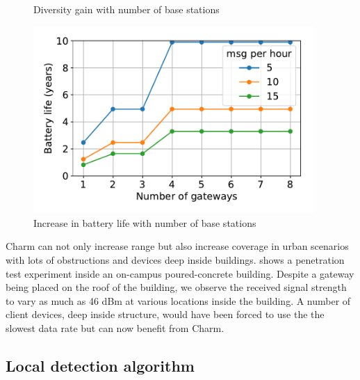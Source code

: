 \begin{figure}
\begin{minipage}{.32\textwidth}
\hspace*{-0.1in}
\caption{Diversity gain with number of base stations}
\label{fig:diversity-gain}
\compactimg
\end{minipage}
\hfill
\begin{minipage}{.32\textwidth}
\centering
\includegraphics[width=0.95\textwidth]{figures/diversity_battery}
\hspace*{-0.1in}
\caption{Increase in battery life with number of base stations}
\label{fig:diversity-battery}
\compactimg
\end{minipage}
\end{figure}




Charm can not only increase range but also increase coverage in urban
scenarios with lots of obstructions and devices deep inside buildings.
 shows a penetration test experiment inside an
on-campus poured-concrete building. Despite a gateway being placed on the roof
of the building, we observe the received signal strength to vary as much as 46
dBm at various locations inside the building. A number of client devices, deep
inside structure, would have been forced to use the the slowest data rate but
can now benefit from Charm.

\subsection{Local detection algorithm}
\label{sec:local-detection-eval}


